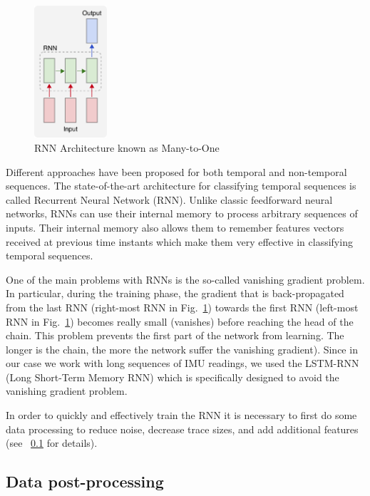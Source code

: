 \documentclass{article}
\begin{document}
\begin{figure}
    \centering
    \vspace{-8pt}
    \includegraphics[width=0.24\textwidth]{figures/rnn}
    \caption{RNN Architecture known as Many-to-One \label{fig:rnn}}
    \vspace{-12pt}
\end{figure}

Different approaches have been proposed for both temporal and non-temporal sequences.
The state-of-the-art architecture for classifying temporal sequences is called Recurrent Neural
Network (RNN). Unlike classic feedforward neural networks, RNNs can use their internal memory
to process arbitrary sequences of inputs. Their internal memory also allows them to remember
features vectors received at previous time instants which make them very effective in classifying
temporal sequences.

One of the main problems with RNNs is the so-called vanishing gradient problem. In particular,
during the training phase, the gradient that is back-propagated from the last RNN (right-most
RNN in Fig.~\ref{fig:rnn}) towards the first RNN (left-most RNN in Fig.~\ref{fig:rnn}) becomes
really small (vanishes) before reaching the head of the chain. This problem prevents the first
part of the network from learning. The longer is the chain, the more the network suffer
the vanishing gradient). Since in our case we work with long sequences of IMU readings, we used
the LSTM-RNN (Long Short-Term Memory RNN) which is specifically designed to avoid the
vanishing gradient problem.

In order to quickly and effectively train the RNN it is necessary to first do some data processing
to reduce noise, decrease trace sizes, and add additional features (see ~\ref{subs:postproc} for details).


\subsection{Data post-processing}\label{subs:postproc}
\vspace{-.2cm}
\end{document}
